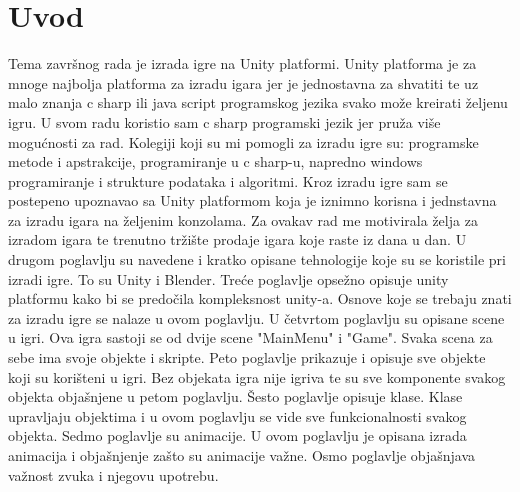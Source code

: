 \section{Uvod}
Tema završnog rada je izrada igre na Unity platformi. Unity platforma je za mnoge najbolja platforma za izradu igara jer je jednostavna za shvatiti te uz malo znanja c sharp ili java script programskog jezika svako može kreirati željenu igru. U svom radu koristio sam c sharp programski jezik jer pruža više mogućnosti za rad. Kolegiji koji su mi pomogli za izradu igre su: programske metode i apstrakcije, programiranje u c sharp-u, napredno windows programiranje i strukture podataka i algoritmi.
Kroz izradu igre sam se postepeno upoznavao sa Unity platformom koja je iznimno korisna i jednstavna za izradu igara na željenim konzolama.
Za ovakav rad me motivirala želja za izradom igara te trenutno tržište prodaje igara koje raste iz dana u dan.
U drugom poglavlju su navedene i kratko opisane tehnologije koje su se koristile pri izradi igre. To su Unity i Blender.
Treće poglavlje opsežno opisuje unity platformu kako bi se predočila kompleksnost unity-a. Osnove koje se trebaju znati za izradu igre se nalaze u ovom poglavlju.
U četvrtom poglavlju su opisane scene u igri. Ova igra sastoji se od dvije scene "MainMenu" i "Game". Svaka scena za sebe ima svoje objekte i skripte.
Peto poglavlje prikazuje i opisuje sve objekte koji su korišteni u igri. Bez objekata igra nije igriva te su sve komponente svakog objekta objašnjene u petom poglavlju.
Šesto poglavlje opisuje klase. Klase upravljaju objektima i u ovom poglavlju se vide sve funkcionalnosti svakog objekta.
Sedmo poglavlje su animacije. U ovom poglavlju je opisana izrada animacija i objašnjenje zašto su animacije važne.
Osmo poglavlje objašnjava važnost zvuka i njegovu upotrebu.
